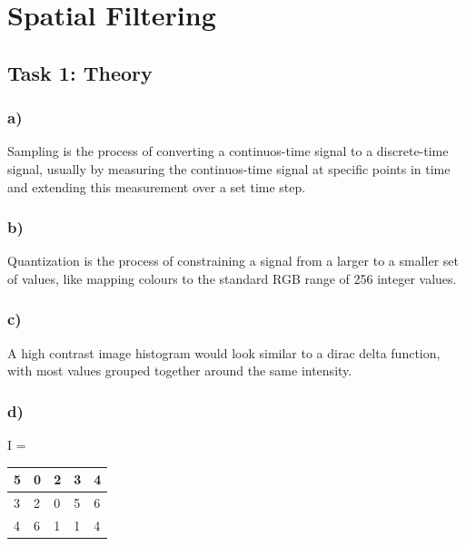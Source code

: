 \section{Spatial Filtering}
\subsection{Task 1: Theory}
\subsubsection*{a)}
Sampling is the process of converting a continuos-time signal to a discrete-time signal, usually by measuring the continuos-time signal at specific points in time and extending this measurement over a set time step. 

\subsubsection*{b)}
Quantization is the process of constraining a signal from a larger to a smaller set of values, like mapping colours to the standard RGB range of 256 integer values. 

\subsubsection*{c)}
A high contrast image histogram would look similar to a dirac delta function, with most values grouped together around the same intensity.

\subsubsection*{d)}


\begin{table}[]
    \label{tab:initial_image}
    I = \begin{tabular}{|l|l|l|l|l|}
        \hline
        5 & 0 & 2 & 3 & 4 \\ \hline
        3 & 2 & 0 & 5 & 6 \\ \hline
        4 & 6 & 1 & 1 & 4 \\ \hline
    \end{tabular}
\end{table}


